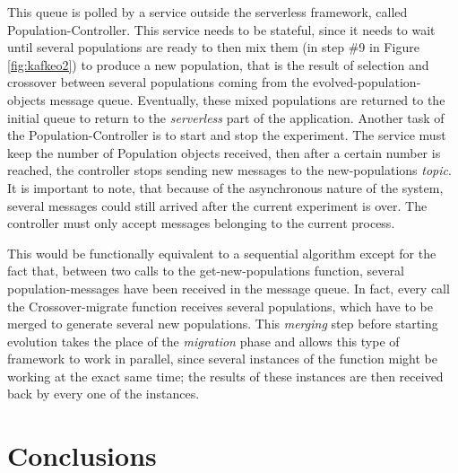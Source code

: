 \documentclass[sigconf]{acmart}
\begin{document}
This queue is polled by a service outside the serverless framework, called
{\sf Population-Controller}. This service needs to be stateful, since
it needs to wait until several populations are ready to then mix them (in
step \#9 in Figure \ref{fig:kafkeo2}) to produce a new population, that is the result of selection
and crossover between several populations coming from the {\sf
  evolved-population-objects} message queue. Eventually, these mixed
populations are returned to the initial queue to return to the {\em
  serverless} part of the application. Another task of the
  {\sf Population-Controller} is to start and stop the experiment. The service must
  keep the number of Population objects received, then after
  a certain number is reached, the controller stops sending new messages to the
  {\sf new-populations} {\em topic}. It is important to note, that because of
  the asynchronous nature of the system, several messages could still
  arrived after the current experiment is over. The controller must only
  accept messages belonging to the current process.


This would be functionally equivalent to a sequential algorithm except
for the fact that, between two calls to the {\sf get-new-populations}
function, several
population-messages have been received in the message queue. In fact,
every call the {\sf Crossover-migrate} function receives several populations, which
have to be merged to generate several new populations. This {\em merging} step
before starting evolution takes the place of the {\em migration} phase
and allows this type of framework to work in parallel, since several
instances of the function might be working at the exact same time; the
results of these instances are then received back by every one of the
instances.



\section{Conclusions}
\label{sec:con}
\end{document}
